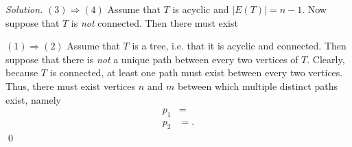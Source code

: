 \documentclass[11pt,letterpaper]{article}
\newenvironment{solution}{\color{Violet}\textit{Solution.}}{\color{black}}
\begin{document}
\begin{enumerate}
\begin{solution}
        $(3)\Rightarrow(4)$ Assume that $T$ is acyclic and $|E(T)| = n-1$. Now suppose that $T$ is \textit{not} connected. Then there must exist 

        $(1)\Rightarrow(2)$ Assume that $T$ is a tree, i.e. that it is acyclic and connected. Then suppose that there is \textit{not} a unique path between every two vertices of $T$. Clearly, because $T$ is connected, at least one path must exist between every two vertices. Thus, there must exist vertices $n$ and $m$ between which multiple distinct paths exist, namely
        \begin{align*}
            p_1 &= \\
            p_2 &= .
        \end{align*}
    \qed
    \end{solution}
\end{enumerate}
\end{document}
